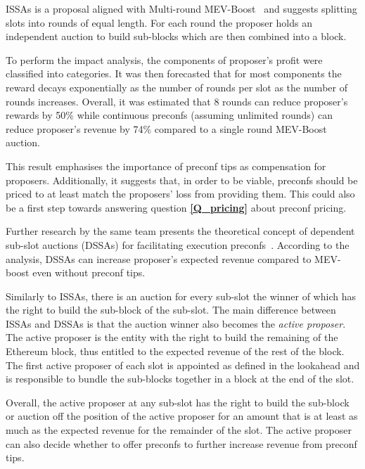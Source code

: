 \documentclass[a4paper]{article}
\theoremstyle{boldstyle}
\begin{document}
    ISSAs is a proposal aligned with Multi-round MEV-Boost~\cite{W:BasedPreconfirmationswithMulti-roundMEV-Boost} and suggests splitting slots into rounds of equal length. For each round the proposer holds an independent auction to build sub-blocks which are then combined into a block.

    To perform the impact analysis, the components of proposer's profit were classified into categories. It was then forecasted that for most components the reward decays exponentially as the number of rounds per slot as the number of rounds increases. Overall, it was estimated that 8 rounds can reduce proposer's rewards by 50\% while continuous preconfs (assuming unlimited rounds) can reduce proposer's revenue by 74\% compared to a single round MEV-Boost auction.

    This result emphasises the importance of preconf tips as compensation for proposers. Additionally, it suggests that, in order to be viable, preconfs should be priced to at least match the proposers' loss from providing them. This could also be a first step towards answering question \textbf{\ref{Q_pricing}} about preconf pricing.
    
    Further research by the same team presents the theoretical concept of dependent sub-slot auctions (DSSAs) for facilitating execution preconfs~\cite{W:AnalysingExpectedProposerRevenuefromPreconfirmations}. According to the analysis, DSSAs can increase proposer's expected revenue compared to MEV-boost even without preconf tips.

    Similarly to ISSAs, there is an auction for every sub-slot the winner of which has the right to build the sub-block of the sub-slot. The main difference between ISSAs and DSSAs is that the auction winner also becomes the \textit{active proposer}. The active proposer is the entity with the right to build the remaining of the Ethereum block, thus entitled to the expected revenue of the rest of the block. The first active proposer of each slot is appointed as defined in the lookahead and is responsible to bundle the sub-blocks together in a block at the end of the slot.

    Overall, the active proposer at any sub-slot has the right to build the sub-block or auction off the position of the active proposer for an amount that is at least as much as the expected revenue for the remainder of the slot. The active proposer can also decide whether to offer preconfs to further increase revenue from preconf tips.
\end{document}
